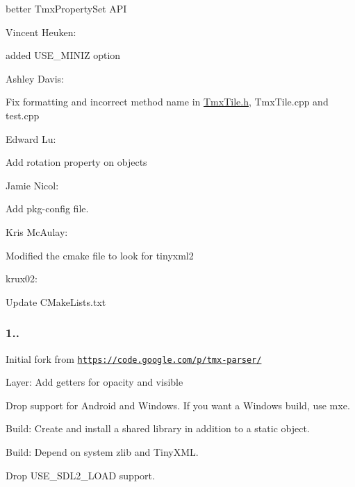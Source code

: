 \begin{DoxyItemize}
\begin{DoxyItemize}
\item better Tmx\-Property\-Set A\-P\-I
\end{DoxyItemize}
\item Vincent Heuken\-:
\begin{DoxyItemize}
\item added {\ttfamily U\-S\-E\-\_\-\-M\-I\-N\-I\-Z} option
\end{DoxyItemize}
\item Ashley Davis\-:
\begin{DoxyItemize}
\item Fix formatting and incorrect method name in \hyperlink{TmxTile_8h_source}{Tmx\-Tile.\-h}, Tmx\-Tile.\-cpp and test.\-cpp
\end{DoxyItemize}
\item Edward Lu\-:
\begin{DoxyItemize}
\item Add rotation property on objects
\end{DoxyItemize}
\item Jamie Nicol\-:
\begin{DoxyItemize}
\item Add pkg-\/config file.
\end{DoxyItemize}
\item Kris Mc\-Aulay\-:
\begin{DoxyItemize}
\item Modified the cmake file to look for tinyxml2
\end{DoxyItemize}
\item krux02\-:
\begin{DoxyItemize}
\item Update C\-Make\-Lists.\-txt
\end{DoxyItemize}
\end{DoxyItemize}

\subsubsection*{1..}


\begin{DoxyItemize}
\item Initial fork from \href{https://code.google.com/p/tmx-parser/}{\tt https\-://code.\-google.\-com/p/tmx-\/parser/}
\item Layer\-: Add getters for opacity and visible
\item Drop support for Android and Windows. If you want a Windows build, use mxe.
\item Build\-: Create and install a shared library in addition to a static object.
\item Build\-: Depend on system zlib and Tiny\-X\-M\-L.
\item Drop {\ttfamily U\-S\-E\-\_\-\-S\-D\-L2\-\_\-\-L\-O\-A\-D} support. 
\end{DoxyItemize}